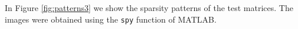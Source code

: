 In Figure \ref{fig:patterns3} we show the sparsity patterns of the test matrices. The images were obtained using the \verb|spy| function of MATLAB.

\begin{figure}[H]
	\centering
\end{figure}
